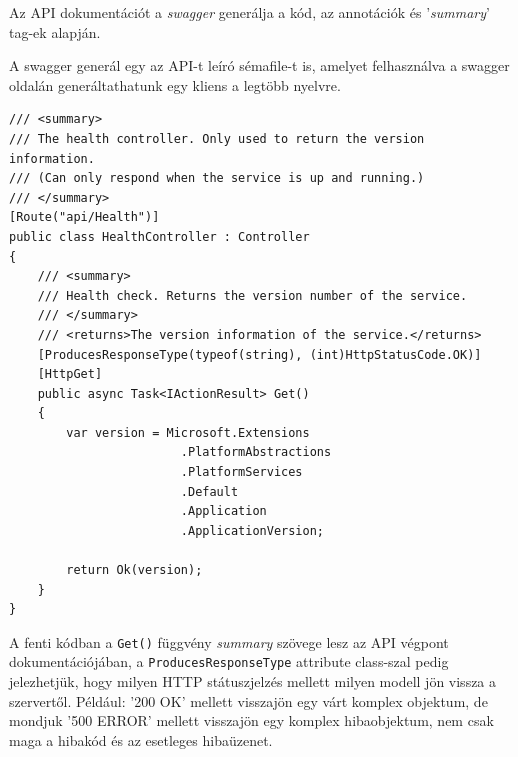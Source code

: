 \documentclass[twoside, a4paper, 12pt]{article}
\begin{document}
Az API dokumentációt a \textit{swagger}\cite{swaggerHomepage} generálja a kód, az annotációk és '\textit{summary}' tag-ek alapján.

A swagger generál egy az API-t leíró sémafile-t is, amelyet felhasználva a swagger oldalán generáltathatunk egy kliens a legtöbb nyelvre.

\begin{lstlisting}[caption=Health-check példakód 'summary' tag-ekkel., label=lst:healtcheck]
/// <summary>
/// The health controller. Only used to return the version information.
/// (Can only respond when the service is up and running.)
/// </summary>
[Route("api/Health")]
public class HealthController : Controller
{
	/// <summary>
	/// Health check. Returns the version number of the service.
	/// </summary>
	/// <returns>The version information of the service.</returns>
	[ProducesResponseType(typeof(string), (int)HttpStatusCode.OK)]
	[HttpGet]
	public async Task<IActionResult> Get()
	{
		var version = Microsoft.Extensions
						.PlatformAbstractions
						.PlatformServices
						.Default
						.Application
						.ApplicationVersion;

		return Ok(version);
	}
}
\end{lstlisting}

A fenti kódban a \texttt{Get()} függvény \textit{summary} szövege lesz az API végpont dokumentációjában, a \texttt{ProducesResponseType} attribute class-szal pedig jelezhetjük, hogy milyen HTTP státuszjelzés mellett milyen modell jön vissza a szervertől. Például: '200 OK' mellett visszajön egy várt komplex objektum, de mondjuk '500 ERROR' mellett visszajön egy komplex hibaobjektum, nem csak maga a hibakód és az esetleges hibaüzenet.
\end{document}
